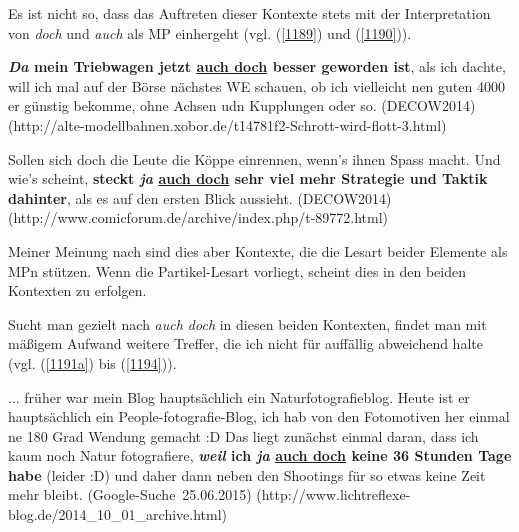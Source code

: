 {Es ist nicht so, dass das Auftreten dieser Kontexte stets mit der Interpretation von \textit{doch} und \textit{auch} als MP einhergeht (vgl. (\ref{1189}) und (\ref{1190})).

\begin{exe}
	\ex\label{1189} 
	\scriptsize
	\textbf{\textit{Da} mein Triebwagen jetzt \underline{auch doch} besser geworden ist}, als ich dachte, will ich mal auf der Börse nächstes WE schauen, 		ob ich vielleicht nen guten 4000 er günstig bekomme, ohne Achsen udn Kupplungen oder so.			
	\hfill\hbox{(DECOW2014)}	
	\newline
	\hbox{}\hfill\hbox{(http://alte-modellbahnen.xobor.de/t14781f2-Schrott-wird-flott-3.html)}
\end{exe}	

\begin{exe}
	\ex\label{1190} 
	\scriptsize
	Sollen sich doch die Leute die Köppe einrennen, wenn's ihnen Spass macht. Und wie's scheint, \textbf{steckt \textit{ja} \underline{auch doch} sehr viel 	mehr Strategie und Taktik dahinter}, als es auf den ersten Blick aussieht.			
	\newline
	\hbox{}\hfill\hbox{(DECOW2014)}	
	\newline
	\hbox{}\hfill\hbox{(http://www.comicforum.de/archive/index.php/t-89772.html)}
\end{exe}					 
Meiner Meinung nach sind dies aber Kontexte, die die Lesart beider Elemente als MPn stützen. Wenn die Partikel-Lesart vorliegt, scheint dies in den beiden Kontexten zu erfolgen.

Sucht man gezielt nach \textit{auch doch} in diesen beiden Kontexten, findet man mit mäßigem Aufwand weitere Treffer, die ich nicht für auffällig abweichend halte (vgl. (\ref{1191a}) bis (\ref{1194})).
	
\begin{exe}
	\ex\label{1191} 
	\scriptsize
	... früher war mein Blog hauptsächlich ein Naturfotografieblog. Heute ist er hauptsächlich ein People-fotografie-Blog, ich hab von den Fotomotiven her 		einmal ne 180 Grad Wendung gemacht :D Das liegt zunächst einmal daran, dass ich kaum noch Natur fotografiere, \textbf{\textit{weil} ich \textit{ja} 		\underline{auch doch} keine 36 Stunden Tage habe} (leider :D) und daher dann neben den Shootings für so etwas keine Zeit mehr bleibt.				
	\hfill\hbox{(Google-Suche 25.06.2015)}	
	\newline
	\hbox{}\hfill\hbox{(http://www.lichtreflexe-blog.de/2014\_10\_01\_archive.html)}
\end{exe}	
	
}
